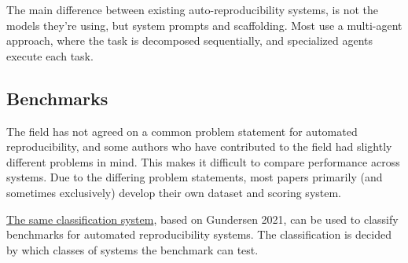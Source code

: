 \documentclass[8pt,a4paper]{article}
\begin{document}
The main difference between existing auto-reproducibility systems, is not the models they're using, but system prompts and scaffolding. 
Most use a multi-agent approach, where the task is decomposed sequentially, and specialized agents execute each task. 

\subsection{Benchmarks}
The field has not agreed on a common problem statement for automated reproducibility, 
and some authors who have contributed to the field had slightly different problems in mind. 
This makes it difficult to compare performance across systems.
Due to the differing problem statements, most papers primarily (and sometimes exclusively) develop their own dataset and scoring system.

\hyperref[itm:classification]{The same classification system}, based on Gundersen 2021\cite{gundersen2021}, can be used to classify benchmarks for automated reproducibility systems.
The classification is decided by which classes of systems the benchmark can test.
\end{document}
